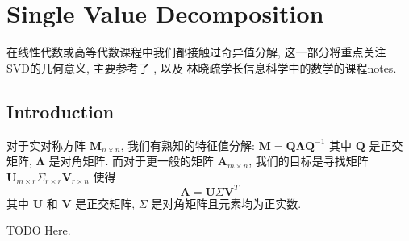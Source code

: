 \section{Single Value Decomposition}
在线性代数或高等代数课程中我们都接触过奇异值分解, 这一部分将重点关注
SVD的几何意义, 主要参考了 \cite{SVD_ref_1}, \cite{SVD_ref_2} 以及 林晓疏学长信息科学中的数学的课程notes.

\subsection{Introduction}
对于实对称方阵 $\mathbf{M}_{n\times n}$, 我们有熟知的特征值分解:
$\mathbf{M} = \mathbf{Q} \mathbf{\Lambda} \mathbf{Q}^{-1}$ 其中 $\mathbf{Q}$ 是正交矩阵, $\mathbf{\Lambda}$ 是对角矩阵. 
而对于更一般的矩阵 $\mathbf{A}_{m\times n}$, 我们的目标是寻找矩阵 $\mathbf{U}_{m\times r} \Sigma_{r\times r} \mathbf{V}_{r\times n}$ 使得
\[
\mathbf{A} = \mathbf{U} \Sigma \mathbf{V}^T
\]
其中 $\mathbf{U}$ 和 $\mathbf{V}$ 是正交矩阵, $\Sigma$ 是对角矩阵且元素均为正实数. 


TODO Here.